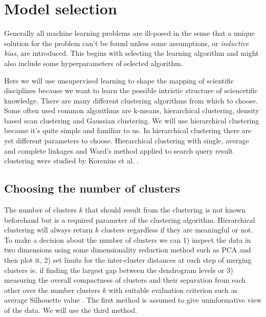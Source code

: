 \section{Model selection}
Generally all machine learning problems are ill-posed in the sense 
that a unique solution for the problem can't be found unless some
assumptions, or \emph{inductive bias}, are introduced. This begins 
with selecting the learning algorithm and might also include some
hyperparameters of selected algorithm.

Here we will use unsupervised learning to shape the mapping of 
scientific disciplines because we want to learn the possible 
intristic structure of sciencetific knowledge.  
There are many different clustering algorithms from which to 
choose. Some often used common algorithms are k-means, hierarchical
clustering, density based scan clustering and Gaussian clustering.
We will use hierarchical clustering because it's quite simple and 
familiar to us.
In hierarchical clustering there are yet different parameters to 
choose. 
Hierarchical clustering with single, average and complete linkages
and Ward's method applied to search query result clustering were 
studied by Korenius et al. \cite{korenius_hierarchical_2006}.

\subsection{Choosing the number of clusters}
The number of clusters $k$ that should result from the clustering is
not known beforehand but is a required parameter of the
clustering algorithm. Hierarchical clustering will always return 
$k$ clusters regardless if they are meaningful or not. To make a
decision about the number of clusters we can 1) inspect the data in 
two dimensions using some dimensionality reduction method such as 
PCA and then plot it, 2) set limits for the inter-cluster 
distances at each step of merging clusters ie. if finding the 
largest gap between the dendrogram levels or 3) measuring the 
overall compactness of clusters and their separation from each 
other over the number clusters $k$ with suitable evaluation 
criterion such as average Silhouette value 
\cite{alpaydin2004introduction} \cite{calinski_dendrite_1974} 
\cite{rousseeuw_silhouettes:_1987}. The first method is assumed to 
give uninformative view of the data. We will use the third method.





